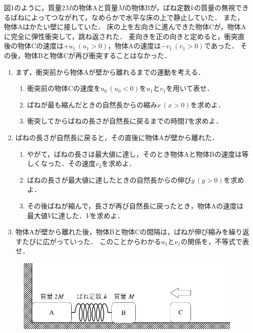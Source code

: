 図1のように，質量$2M$の物体Aと質量$M$の物体Bが，ばね定数$k$の質量の無視できるばねによってつながれて，なめらかで水平な床の上で静止していた．
また，物体Aはかたい壁に接していた．
床の上を左向きに進んできた物体Cが，物体Aに完全に弾性衝突して，跳ね返された．
麦向きを正の向きと定めると，衝突直後の物体Cの速度は$+u_1\,(u_1>0)$，物体Aの速度は$-v_1\,(v_1>0)$であった．
その後，物体Bと物体Cが再び衝突することはなかった．

\begin{enumerate}[I]
  \setlength{\leftskip}{-2zw}
  \setlength{\itemindent}{1zw}\setlength{\labelsep}{0.5zw}
  \setlength{\labelwidth}{1zw}\setlength{\leftmargin}{1zw}
  \setlength{\itemsep}{0.5\baselineskip}
  \item まず，衝突前から物体Aが壁から離れるまでの運動を考える．
  \begin{enumerate}[（1）]
    \setlength{\leftskip}{-2.5zw}
    \setlength{\itemindent}{1zw}\setlength{\labelsep}{1zw}
    \setlength{\labelwidth}{1zw}
    \item 衝突前の物体Cの速度を$u_0\,(u_0<0)$を$u_1$と$v_1$を用いて表せ．
    \item ばねが最も縮んだときの自然長からの縮み$x\,(x>0)$を求めよ．
    \item 衝突してからばねの長さが自然長に戻るまでの時間$T$を求めよ．
  \end{enumerate}
  \item ばねの長さが自然長に戻ると，その直後に物体Aが壁から離れた．
  \begin{enumerate}[（1）]
    \setlength{\leftskip}{-2.5zw}
    \setlength{\itemindent}{1zw}\setlength{\labelsep}{1zw}
    \setlength{\labelwidth}{1zw}
    \item やがて，ばねの長さは最大値に達し，そのとき物体Aと物体Bの速度は等しくなった．その速度$v_2$を求めよ．
    \item ばねの長さが最大値に達したときの自然長からの伸び$y\,(y>0)$を求めよ．
    \item その後ばねが縮んで，長さが再び自然長に戻ったとき，物体Aの速度は最大値$V$に達した．$V$を求めよ．
  \end{enumerate}
  \item 物体Aが壁から離れた後，物体Bと物体Cの間隔は，ばねが伸び縮みを繰り返すたびに広がっていった．
  このことからわかる$u_1$と$v_1$の関係を，不等式で表せ．
\end{enumerate}



\begin{figure}[htbp]
  \centering
  \includegraphics[width=.8\columnwidth]{../graphs/todai_03-1.png}
  \caption{}
\end{figure}

